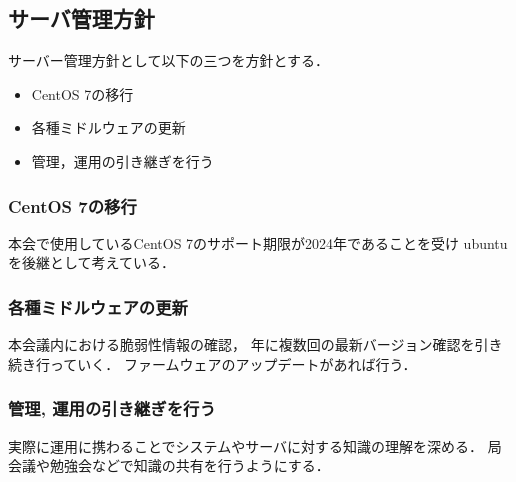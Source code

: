 \subsection*{サーバ管理方針}


サーバー管理方針として以下の三つを方針とする．
\begin{itemize}
    \item CentOS 7の移行
    \item 各種ミドルウェアの更新
    \item 管理，運用の引き継ぎを行う
\end{itemize}

\subsubsection*{CentOS 7の移行}
本会で使用しているCentOS 7のサポート期限が2024年であることを受け
ubuntuを後継として考えている．


\subsubsection*{各種ミドルウェアの更新}
本会議内における脆弱性情報の確認，
年に複数回の最新バージョン確認を引き続き行っていく．
ファームウェアのアップデートがあれば行う．


\subsubsection*{管理, 運用の引き継ぎを行う}
実際に運用に携わることでシステムやサーバに対する知識の理解を深める．
局会議や勉強会などで知識の共有を行うようにする．
